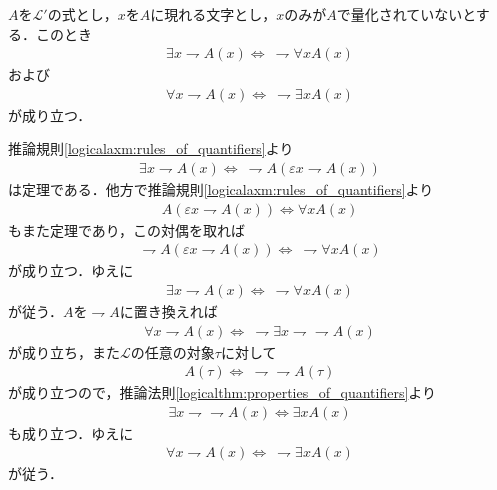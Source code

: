 	\begin{screen}
		\begin{logicalthm}\label{logicalthm:De_Morgan_law_for_quantifiers}
			$A$を$\mathcal{L}'$の式とし，$x$を$A$に現れる文字とし，$x$のみが$A$で量化されていないとする．このとき
			\begin{align}
				\exists x \rightharpoondown A(x) \Longleftrightarrow\ \rightharpoondown \forall x A(x)
			\end{align}
			および
			\begin{align}
				\forall x \rightharpoondown A(x) \Longleftrightarrow\ \rightharpoondown \exists x A(x)
			\end{align}
			が成り立つ．
		\end{logicalthm}
	\end{screen}
	
	\begin{sketch}
		推論規則\ref{logicalaxm:rules_of_quantifiers}より
		\begin{align}
			\exists x \rightharpoondown A(x) \Longleftrightarrow\ 
			\rightharpoondown A(\varepsilon x \rightharpoondown A(x))
		\end{align}
		は定理である．他方で推論規則\ref{logicalaxm:rules_of_quantifiers}より
		\begin{align}
			A(\varepsilon x \rightharpoondown A(x)) \Longleftrightarrow \forall x A(x) 
		\end{align}
		もまた定理であり，この対偶を取れば
		\begin{align}
			\rightharpoondown A(\varepsilon x \rightharpoondown A(x)) \Longleftrightarrow\ 
			\rightharpoondown \forall x A(x)
		\end{align}
		が成り立つ．ゆえに
		\begin{align}
			\exists x \rightharpoondown A(x) \Longleftrightarrow\ \rightharpoondown \forall x A(x)
		\end{align}
		が従う．$A$を$\rightharpoondown A$に置き換えれば
		\begin{align}
			\forall x \rightharpoondown A(x) \Longleftrightarrow\ 
			\rightharpoondown \exists x \rightharpoondown \rightharpoondown A(x)
		\end{align}
		が成り立ち，また$\mathcal{L}$の任意の対象$\tau$に対して
		\begin{align}
			A(\tau) \Longleftrightarrow\ \rightharpoondown \rightharpoondown A(\tau)
		\end{align}
		が成り立つので，推論法則\ref{logicalthm:properties_of_quantifiers}より
		\begin{align}
			\exists x \rightharpoondown \rightharpoondown A(x)
			\Longleftrightarrow \exists x A(x)
		\end{align}
		も成り立つ．ゆえに
		\begin{align}
			\forall x \rightharpoondown A(x) \Longleftrightarrow\ 
			\rightharpoondown \exists x A(x)
		\end{align}
		が従う．
		\QED
	\end{sketch}